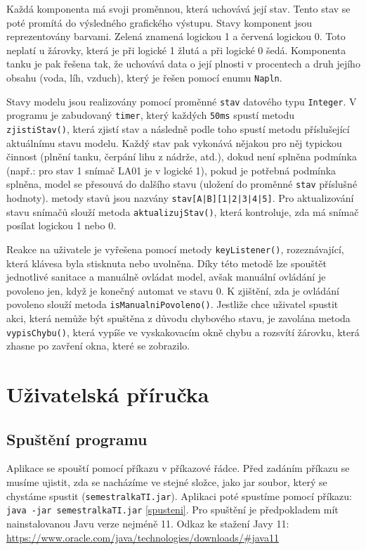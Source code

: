 \documentclass[12pt, a4paper]{article}
\begin{document}
\vspace{0.25cm}
Každá komponenta má svoji proměnnou, která uchovává její stav. Tento stav se poté promítá do výsledného grafického výstupu. Stavy komponent jsou reprezentovány barvami. Zelená znamená logickou 1 a červená logickou 0. Toto neplatí u žárovky, která je při logické 1 žlutá a při logické 0 šedá. Komponenta tanku je pak řešena tak, že uchovává data o její plnosti v procentech a druh jejího obsahu (voda, líh, vzduch), který je řešen pomocí enumu \texttt{Napln}.

\vspace{0.25cm}
Stavy modelu jsou realizovány pomocí proměnné \texttt{stav} datového typu \texttt{Integer}. V programu je zabudovaný \texttt{timer}, který každých \texttt{50ms} spustí metodu \newline \texttt{zjistiStav()}, která zjistí stav a následně podle toho spustí metodu příslušející aktuálnímu stavu modelu. Každý stav pak vykonává nějakou pro něj typickou činnost (plnění tanku, čerpání lihu z nádrže, atd.), dokud není splněna podmínka (např.: pro stav 1 snímač LA01 je v logické 1), pokud je potřebná podmínka splněna, model se přesouvá do dalšího stavu (uložení do proměnné \texttt{stav} příslušné hodnoty). metody stavů jsou nazvány \texttt{stav[A|B][1|2|3|4|5]}. Pro aktualizování stavu snímačů slouží metoda \texttt{aktualizujStav()}, která kontroluje, zda má snímač posílat logickou 1 nebo 0.

\vspace{0.25cm}
Reakce na uživatele je vyřešena pomocí metody \texttt{keyListener()}, rozeznávající, která klávesa byla stisknuta nebo uvolněna. Díky této metodě lze spouštět jednotlivé sanitace a manuálně ovládat model, avšak manuální ovládání je povoleno jen, když je konečný automat ve stavu 0. K zjištění, zda je ovládání povoleno slouží metoda \texttt{isManualniPovoleno()}. Jestliže chce uživatel spustit akci, která nemůže být spuštěna z důvodu chybového stavu, je zavolána metoda \texttt{vypisChybu()}, která vypíše ve vyskakovacím okně chybu a rozsvítí žárovku, která zhasne po zavření okna, které se zobrazilo.

\section{Uživatelská příručka}

\subsection{Spuštění programu}
Aplikace se spouští pomocí příkazu v příkazové řádce. Před zadáním příkazu se musíme ujistit, zda se nacházíme ve stejné složce, jako jar soubor, který se chystáme spustit (\texttt{semestralkaTI.jar}). Aplikaci poté spustíme pomocí příkazu: \texttt{java -jar semestralkaTI.jar} \ref{spusteni}. Pro spuštění je předpokladem mít nainstalovanou Javu verze nejméně 11. Odkaz ke stažení Javy 11: \url{ https://www.oracle.com/java/technologies/downloads/#java11}
\end{document}
